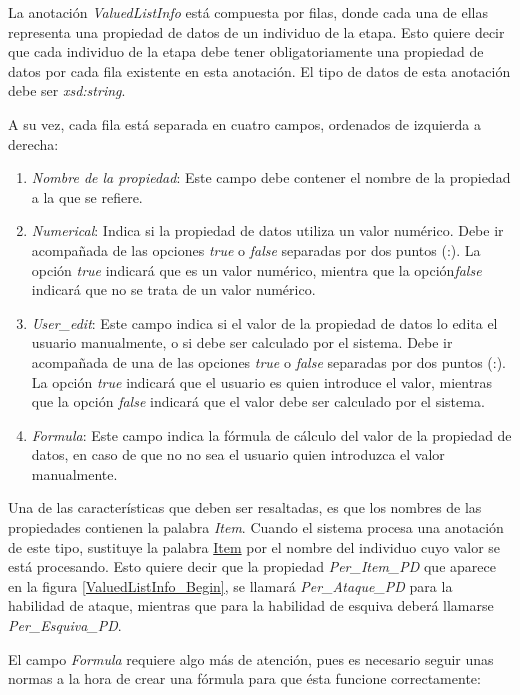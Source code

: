 La anotación \textit{ValuedListInfo} está compuesta por filas, donde cada una de ellas representa una propiedad de datos 
de un individuo de la etapa. Esto quiere decir que cada individuo de la etapa debe tener obligatoriamente una propiedad 
de datos por cada fila existente en esta anotación. El tipo de datos de esta anotación debe ser \textit{xsd:string}. \medskip

A su vez, cada fila está separada en cuatro campos, ordenados de izquierda a derecha:
\begin{enumerate}
    \item \textit{Nombre de la propiedad}: Este campo debe contener el nombre de la propiedad a la que se refiere.
    \item \textit{Numerical}: Indica si la propiedad de datos utiliza un valor numérico. Debe ir acompañada de las opciones 
    \textit{true} o \textit{false} separadas por dos puntos (:). La opción \textit{true} indicará que es un valor numérico, 
    mientra que la opción\textit{false} indicará que no se trata de un valor numérico.
    \item \textit{User\_edit}: Este campo indica si el valor de la propiedad de datos lo edita el usuario manualmente, o si 
    debe ser calculado por el sistema. Debe ir acompañada de una de las opciones \textit{true} o \textit{false} 
    separadas por dos puntos (:). La opción \textit{true} indicará que el usuario es quien introduce el valor, mientras que 
    la opción \textit{false} indicará que el valor debe ser calculado por el sistema.
    \item \textit{Formula}: Este campo indica la fórmula de cálculo del valor de la propiedad de datos, en caso de que no 
    no sea el usuario quien introduzca el valor manualmente.
\end{enumerate}

Una de las características que deben ser resaltadas, es que los nombres de las propiedades contienen la palabra \textit{Item}.
Cuando el sistema procesa una anotación de este tipo, sustituye la palabra \underline{Item} por el nombre del individuo cuyo valor se 
está procesando. Esto quiere decir que la propiedad \textit{Per\_Item\_PD} que aparece en la figura \ref*{ValuedListInfo_Begin}, 
se llamará \textit{Per\_Ataque\_PD} para la habilidad de ataque, mientras que para la habilidad de esquiva deberá llamarse 
\textit{Per\_Esquiva\_PD}. \medskip

El campo \textit{Formula} requiere algo más de atención, pues es necesario seguir unas normas a la hora de crear una fórmula 
para que ésta funcione correctamente:

